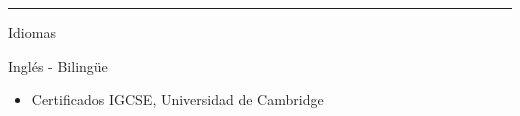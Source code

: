 \documentclass[a4paper,10pt]{article}
\newlength{\cvcolumngapwidth}
\newlength{\cvleftcolumnwidth}
\newlength{\cvrightcolumnwidth}
\newcommand{\cvsectionstyle}[1]{{\normalsize\cvsectionfont\textcolor{cvsectioncolor}{#1}}}
\newcommand{\cvtitlestyle}[1]{{\large\cvtitlefont\textcolor{cvtitlecolor}{#1}}}
\newcommand{\cvdurationstyle}[1]{{\small\cvdurationfont\textcolor{cvdurationcolor}{#1}}}
\newcommand{\cvheadingstyle}[1]{{\normalsize\cvheadingfont\textcolor{cvheadingcolor}{#1}}}
\newlength{\cvafteritemskipamount}
\newlength{\cvaftersectionskipamount}
\newlength{\cvbetweensectionandheadingextraskipamount}
\newlength{\cvaftertitleskipamount}
\newlength{\cvparskip}
\newcommand{\cvsection}[1]{
    \begin{minipage}[t]{\cvleftcolumnwidth}
        \raggedleft\cvsectionstyle{#1}
    \end{minipage}%
    \hspace{\cvcolumngapwidth}%
    \begin{minipage}[t]{\cvrightcolumnwidth}
        \textcolor{cvrulecolor}{\rule{\cvrightcolumnwidth}{0.3mm}}
    \end{minipage}

    \vspace{\cvaftersectionskipamount}
}
\newcommand{\cvitem}[2]{
    \begin{minipage}[t]{\cvleftcolumnwidth}
        \raggedleft #1
    \end{minipage}%
    \hspace{\cvcolumngapwidth}%
    \begin{minipage}[t]{\cvrightcolumnwidth}
        \setlength{\parskip}{\cvparskip} #2
    \end{minipage}

    \vspace{\cvafteritemskipamount}
}
\newcommand{\cvtitle}[1]{
    \cvtitlestyle{#1}

    \vspace{\cvaftertitleskipamount}
    \vspace{-\cvparskip}
}
\begin{document}





\cvsection{HABILIDADES}

\vspace{\cvbetweensectionandheadingextraskipamount}

\cvitem{
    \cvheadingstyle{Idiomas}
}{
    Inglés - Bilingüe
    \begin{itemize}
        \item Certificados IGCSE, Universidad de Cambridge
    \end{itemize}

}

%     

%     
%     
%     





\end{document}
